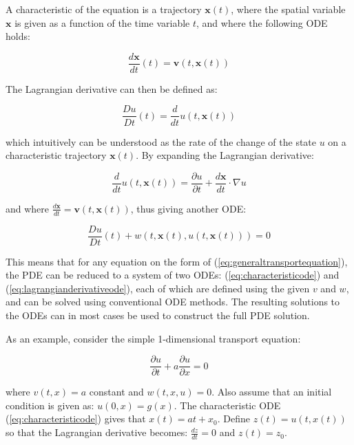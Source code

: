 A characteristic of the equation is a trajectory $\bm{x}(t)$, where the spatial variable $\bm{x}$ is given as a function of the time variable $t$, and where the following ODE holds:

\begin{equation}
    \frac{d \bm{x}}{d t}(t) = \bm{v}(t, \bm{x}(t))
    \label{eq:characteristicode}
\end{equation}

The Lagrangian derivative can then be defined as:

\begin{equation}
    \frac{D u}{D t}(t) = \frac{d}{d t} u(t, \bm{x}(t))
\end{equation}

\noindent which intuitively can be understood as the rate of the change of the state $u$ on a characteristic trajectory $\bm{x}(t)$. By expanding the Lagrangian derivative:

\begin{equation}
    \frac{d}{d t} u(t, \bm{x}(t)) = \frac{\partial u}{\partial t} + \frac{d \bm{x}}{d t} \cdot \nabla u
\end{equation}

\noindent and where $\frac{d \bm{x}}{d t} = \bm{v}(t, \bm{x}(t))$, thus giving another ODE:

\begin{equation}
    \frac{D u}{D t}(t) + w(t, \bm{x}(t), u(t, \bm{x}(t))) = 0
    \label{eq:lagrangianderivativeode}
\end{equation}

This means that for any equation on the form of (\ref{eq:generaltransportequation}), the PDE can be reduced to a system of two ODEs: (\ref{eq:characteristicode}) and (\ref{eq:lagrangianderivativeode}), each of which are defined using the given $v$ and $w$, and can be solved using conventional ODE methods. The resulting solutions to the ODEs can in most cases be used to construct the full PDE solution.

As an example, consider the simple 1-dimensional transport equation:

\begin{equation}
    \frac{\partial u}{\partial t} + a \frac{\partial u}{\partial x} = 0
\end{equation}

\noindent where $v(t, x) = a$ constant and $w(t, x, u) = 0$. Also assume that an initial condition is given as: $u(0, x) = g(x)$. The characteristic ODE (\ref{eq:characteristicode}) gives that $x(t) = a t + x_0$. Define $z(t) = u(t, x(t))$ so that the Lagrangian derivative becomes: $\frac{d z}{d t} = 0$ and $z(t) = z_0$.

